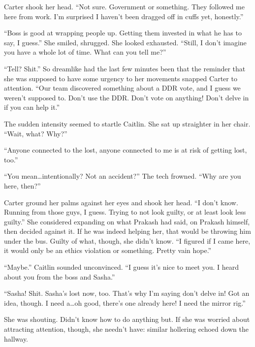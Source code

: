 Carter shook her head. ``Not sure. Government or something. They followed me here from work. I'm surprised I haven't been dragged off in cuffs yet, honestly.''

``Boss is good at wrapping people up. Getting them invested in what he has to say, I guess.'' She smiled, shrugged. She looked exhausted. ``Still, I don't imagine you have a whole lot of time. What can you tell me?''

``Tell? Shit.'' So dreamlike had the last few minutes been that the reminder that she was supposed to have some urgency to her movements snapped Carter to attention. ``Our team discovered something about a DDR vote, and I guess we weren't supposed to. Don't use the DDR. Don't vote on anything! Don't delve in if you can help it.''

The sudden intensity seemed to startle Caitlin. She sat up straighter in her chair. ``Wait, what? Why?''

``Anyone connected to the lost, anyone connected to me is at risk of getting lost, too.''

``You mean\ldots{}intentionally? Not an accident?'' The tech frowned. ``Why are you here, then?''

Carter ground her palms against her eyes and shook her head. ``I don't know. Running from those guys, I guess. Trying to not look guilty, or at least look less guilty.'' She considered expanding on what Prakash had said, on Prakash himself, then decided against it. If he was indeed helping her, that would be throwing him under the bus. Guilty of what, though, she didn't know. ``I figured if I came here, it would only be an ethics violation or something. Pretty vain hope.''

``Maybe.'' Caitlin sounded unconvinced. ``I guess it's nice to meet you. I heard about you from the boss and Sasha.''

``Sasha! Shit. Sasha's lost now, too. That's why I'm saying don't delve in! Got an idea, though. I need a\ldots{}oh good, there's one already here! I need the mirror rig.''

She was shouting. Didn't know how to do anything but. If she was worried about attracting attention, though, she needn't have: similar hollering echoed down the hallway.
